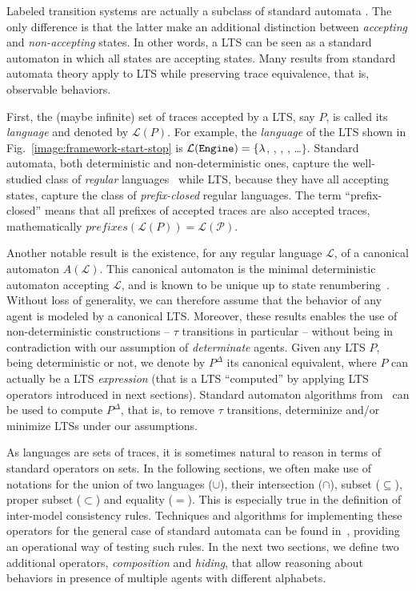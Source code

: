 Labeled transition systems are actually a subclass of standard automata \cite{Hopcroft:1979}. The only difference is that the latter make an additional distinction between \emph{accepting} and \emph{non-accepting} states. In other words, a LTS can be seen as a standard automaton in which all states are accepting states. Many results from standard automata theory apply to LTS while preserving trace equivalence, that is, observable behaviors.

First, the (maybe infinite) set of traces accepted by a LTS, say $P$, is called its \emph{language} and denoted by $\mathcal{L}(P)$. For example, the  \emph{language} of the LTS shown in Fig.~\ref{image:framework-start-stop} is $\mathcal{L}(\texttt{Engine})=\{\lambda$, , , , \ldots $\}$. Standard automata, both deterministic and non-deterministic ones, capture the well-studied class of \emph{regular} languages~\cite{Hopcroft:1979} while LTS, because they have all accepting states, capture the class of \emph{prefix-closed} regular languages. The term ``prefix-closed'' means that all prefixes of accepted traces are also accepted traces, mathematically $prefixes(\mathcal{L}(P)) = \mathcal{L(P)}$.

Another notable result is the existence, for any regular language $\mathcal{L}$, of a canonical automaton $A(\mathcal{L})$. This canonical automaton is the minimal deterministic automaton accepting $\mathcal{L}$, and is known to be unique up to state renumbering~\cite{Gold:1978}. Without loss of generality, we can therefore assume that the behavior of any agent is modeled by a canonical LTS. Moreover, these results enables the use of non-deterministic constructions -- $\tau$ transitions in particular -- without being in contradiction with our assumption of \emph{determinate} agents. Given any LTS $P$, being deterministic or not, we denote by $P^{\Delta}$ its canonical equivalent, where $P$ can actually be a LTS \emph{expression} (that is a LTS ``computed'' by applying LTS operators introduced in next sections). Standard automaton algorithms from~\cite{Hopcroft:1979} can be used to compute $P^\Delta$, that is, to remove $\tau$ transitions, determinize and/or minimize LTSs under our assumptions.

As languages are sets of traces, it is sometimes natural to reason in terms of standard operators on sets. In the following sections, we often make use of notations for the union of two languages ($\cup$), their intersection ($\cap$), subset ($\subseteq$), proper subset ($\subset$) and equality ($=$). This is especially true in the definition of inter-model consistency rules. Techniques and algorithms for implementing these operators for the general case of standard automata can be found in~\cite{Hopcroft:1979, Aho:1986}, providing an operational way of testing such rules. In the next two sections, we define two additional operators, \emph{composition} and \emph{hiding}, that allow reasoning about behaviors in presence of multiple agents with different alphabets.

